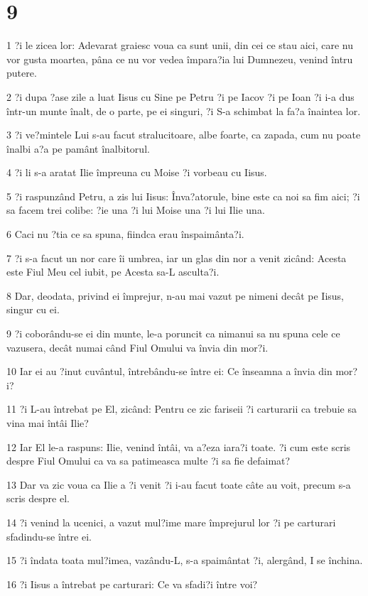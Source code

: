 \chapter{9}

\par 1 ?i le zicea lor: Adevarat graiesc voua ca sunt unii, din cei ce stau aici, care nu vor gusta moartea, pâna ce nu vor vedea împara?ia lui Dumnezeu, venind întru putere.
\par 2 ?i dupa ?ase zile a luat Iisus cu Sine pe Petru ?i pe Iacov ?i pe Ioan ?i i-a dus într-un munte înalt, de o parte, pe ei singuri, ?i S-a schimbat la fa?a înaintea lor.
\par 3 ?i ve?mintele Lui s-au facut stralucitoare, albe foarte, ca zapada, cum nu poate înalbi a?a pe pamânt înalbitorul.
\par 4 ?i li s-a aratat Ilie împreuna cu Moise ?i vorbeau cu Iisus.
\par 5 ?i raspunzând Petru, a zis lui Iisus: Înva?atorule, bine este ca noi sa fim aici; ?i sa facem trei colibe: ?ie una ?i lui Moise una ?i lui Ilie una.
\par 6 Caci nu ?tia ce sa spuna, fiindca erau înspaimânta?i.
\par 7 ?i s-a facut un nor care îi umbrea, iar un glas din nor a venit zicând: Acesta este Fiul Meu cel iubit, pe Acesta sa-L asculta?i.
\par 8 Dar, deodata, privind ei împrejur, n-au mai vazut pe nimeni decât pe Iisus, singur cu ei.
\par 9 ?i coborându-se ei din munte, le-a poruncit ca nimanui sa nu spuna cele ce vazusera, decât numai când Fiul Omului va învia din mor?i.
\par 10 Iar ei au ?inut cuvântul, întrebându-se între ei: Ce înseamna a învia din mor?i?
\par 11 ?i L-au întrebat pe El, zicând: Pentru ce zic fariseii ?i carturarii ca trebuie sa vina mai întâi Ilie?
\par 12 Iar El le-a raspuns: Ilie, venind întâi, va a?eza iara?i toate. ?i cum este scris despre Fiul Omului ca va sa patimeasca multe ?i sa fie defaimat?
\par 13 Dar va zic voua ca Ilie a ?i venit ?i i-au facut toate câte au voit, precum s-a scris despre el.
\par 14 ?i venind la ucenici, a vazut mul?ime mare împrejurul lor ?i pe carturari sfadindu-se între ei.
\par 15 ?i îndata toata mul?imea, vazându-L, s-a spaimântat ?i, alergând, I se închina.
\par 16 ?i Iisus a întrebat pe carturari: Ce va sfadi?i între voi?
